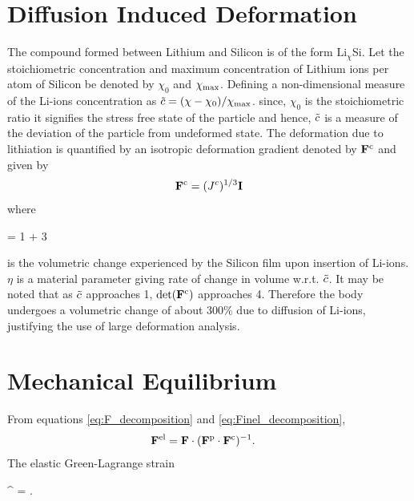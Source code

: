 \section{Diffusion Induced Deformation}
The compound formed between Lithium and Silicon is of the form $\text{Li}_{\chi}$Si. Let the stoichiometric concentration and maximum concentration of Lithium ions per atom of Silicon be denoted by $\chi_0$ and $\chi_{\rm{max}}$. Defining a non-dimensional measure of the Li-ions concentration as $\tilde{c}  = (\chi-\chi_{0})/\chi_{{\rm{max}}}$. since, $\chi_{0}$ is the stoichiometric ratio it signifies the stress free state of the particle and hence, $\tilde{c}$ is a measure of the deviation of the particle from undeformed state. The deformation due to lithiation is quantified by an isotropic deformation gradient denoted by $\mathbf{F}^{\rm{c}}$ and given by
\begin{gather}
    \mathbf{F}^{\rm{c}} = ({J^c})^{1/3} \mathbf{I}
\end{gather}
where \begin{nonumbereq}\jc = 1 + 3 \eta \xmax \tc\end{nonumbereq} is the volumetric change experienced by the Silicon film upon insertion of Li-ions. $\eta$ is a material parameter giving rate of change in volume w.r.t. $\tilde{c}$. It may be noted that as $\tilde{c}$ approaches 1, $\mathrm{det}(\mathbf{F}^{\rm{c}})$ approaches 4. Therefore the body undergoes a volumetric change of about 300\% due to diffusion of Li-ions, justifying the use of large deformation analysis.

\section{Mechanical Equilibrium } \label{section:MechEqbm}
From equations \ref{eq:F_decomposition} and \ref{eq:Finel_decomposition},
\begin{align}
    \mathbf{F}^{{\rm{el}}} &=  \mathbf{F} \cdot (\mathbf{F}^{{\rm{p}}} \cdot \mathbf{F}^{{\rm{c}}})^{-1}. \label{eq:Fel_tensor}
\end{align}
The elastic Green-Lagrange strain
\begin{nonumbereq}
\E^{\el} =  \left[ (\F^\el)^\T \cdot  \F^\el - \I \right].
\end{nonumbereq}


